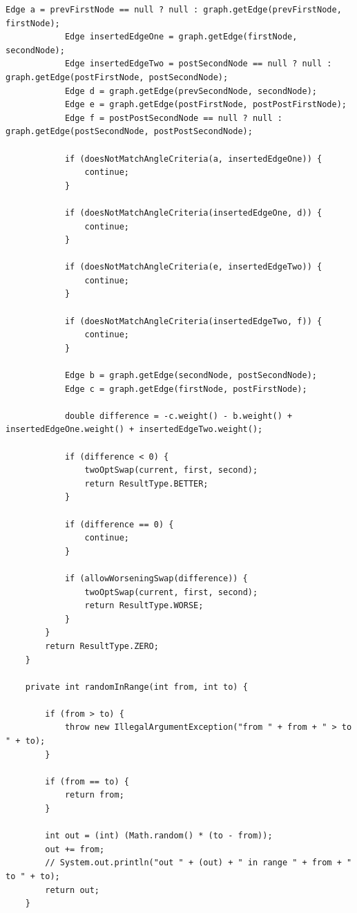 \begin{lstlisting}[label={lst:source}]
            Edge a = prevFirstNode == null ? null : graph.getEdge(prevFirstNode, firstNode);
            Edge insertedEdgeOne = graph.getEdge(firstNode, secondNode);
            Edge insertedEdgeTwo = postSecondNode == null ? null : graph.getEdge(postFirstNode, postSecondNode);
            Edge d = graph.getEdge(prevSecondNode, secondNode);
            Edge e = graph.getEdge(postFirstNode, postPostFirstNode);
            Edge f = postPostSecondNode == null ? null : graph.getEdge(postSecondNode, postPostSecondNode);

            if (doesNotMatchAngleCriteria(a, insertedEdgeOne)) {
                continue;
            }

            if (doesNotMatchAngleCriteria(insertedEdgeOne, d)) {
                continue;
            }

            if (doesNotMatchAngleCriteria(e, insertedEdgeTwo)) {
                continue;
            }

            if (doesNotMatchAngleCriteria(insertedEdgeTwo, f)) {
                continue;
            }

            Edge b = graph.getEdge(secondNode, postSecondNode);
            Edge c = graph.getEdge(firstNode, postFirstNode);

            double difference = -c.weight() - b.weight() + insertedEdgeOne.weight() + insertedEdgeTwo.weight();

            if (difference < 0) {
                twoOptSwap(current, first, second);
                return ResultType.BETTER;
            }

            if (difference == 0) {
                continue;
            }

            if (allowWorseningSwap(difference)) {
                twoOptSwap(current, first, second);
                return ResultType.WORSE;
            }
        }
        return ResultType.ZERO;
    }

    private int randomInRange(int from, int to) {

        if (from > to) {
            throw new IllegalArgumentException("from " + from + " > to " + to);
        }

        if (from == to) {
            return from;
        }

        int out = (int) (Math.random() * (to - from));
        out += from;
        // System.out.println("out " + (out) + " in range " + from + " to " + to);
        return out;
    }


\end{lstlisting}
